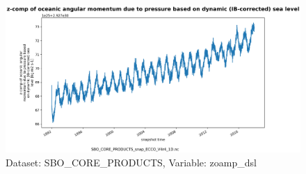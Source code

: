 \begin{figure}[H]
\centering
\includegraphics[scale=0.55]{../images/plots/oneD_plots/SBO_Core_Products/zoamp_dsl.png}
\caption{Dataset: SBO\_CORE\_PRODUCTS, Variable: zoamp\_dsl}
\label{tab:table-SBO_CORE_PRODUCTS_zoamp_dsl-Plot}
\end{figure}
\pagebreak
